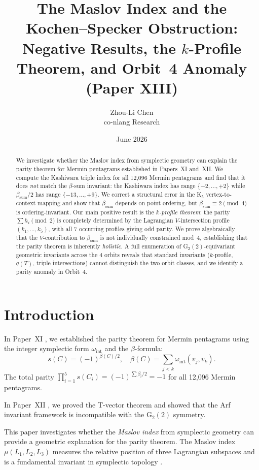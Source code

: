 \documentclass[11pt,a4paper]{article}
\title{The Maslov Index and the Kochen--Specker Obstruction:\\
       Negative Results, the $k$-Profile Theorem, and Orbit~4 Anomaly\\
       {\large (Paper XIII)}}
\author{Zhou-Li Chen \\ co-nlang Research}
\date{June 2026}
\theoremstyle{remark}
\begin{document}
\maketitle

\begin{abstract}
We investigate whether the Maslov index from symplectic geometry can explain the parity theorem for Mermin pentagrams established in Papers~XI and~XII.
We compute the Kashiwara triple index for all 12{,}096 Mermin pentagrams and find that it does \emph{not} match the $\beta$-sum invariant: the Kashiwara index has range $\{-2,\ldots,+2\}$ while $\beta_{\mathrm{sum}}/2$ has range $\{-13,\ldots,+9\}$.
We correct a structural error in the K$_5$ vertex-to-context mapping and show that $\beta_{\mathrm{sum}}$ depends on point ordering, but $\beta_{\mathrm{sum}} \equiv 2 \pmod{4}$ is ordering-invariant.
Our main positive result is the \emph{$k$-profile theorem}: the parity $\sum h_i \pmod{2}$ is completely determined by the Lagrangian $V$-intersection profile $(k_1,\ldots,k_5)$, with all 7 occurring profiles giving odd parity.
We prove algebraically that the $V$-contribution to $\beta_{\mathrm{sum}}$ is not individually constrained mod~4, establishing that the parity theorem is inherently \emph{holistic}.
A full enumeration of G$_2(2)$-equivariant geometric invariants across the 4 orbits reveals that standard invariants ($k$-profile, $q(T)$, triple intersections) cannot distinguish the two orbit classes, and we identify a parity anomaly in Orbit~4.
\end{abstract}


\section{Introduction}

In Paper~XI \cite{PaperXI}, we established the parity theorem for Mermin pentagrams using the integer symplectic form $\omega_{\mathrm{int}}$ and the $\beta$-formula:
\[
  s(C) = (-1)^{\beta(C)/2}, \quad \beta(C) = \sum_{j<k} \omega_{\mathrm{int}}(v_j, v_k).
\]
The total parity $\prod_{i=1}^5 s(C_i) = (-1)^{\sum \beta_i / 2} = -1$ for all 12{,}096 Mermin pentagrams.

In Paper~XII \cite{PaperXII}, we proved the T-vector theorem and showed that the Arf invariant framework is incompatible with the G$_2(2)$ symmetry.

This paper investigates whether the \emph{Maslov index} from symplectic geometry can provide a geometric explanation for the parity theorem.
The Maslov index $\mu(L_1, L_2, L_3)$ measures the relative position of three Lagrangian subspaces and is a fundamental invariant in symplectic topology \cite{LionVergne1980}.
\end{document}
